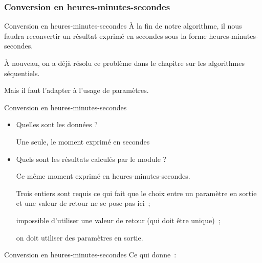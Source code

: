 \subsubsection{Conversion en heures-minutes-secondes}

\begin{frame}{Conversion en heures-minutes-secondes}
	À la fin de notre algorithme, il nous faudra reconvertir un résultat
	exprimé en secondes sous la forme heures-minutes-secondes. 
	
	\bigskip
	
	À nouveau,
	on a déjà résolu ce problème dans le chapitre sur les algorithmes
	séquentiels. 
	
	\bigskip
	
	Mais il faut l'adapter à
	l'usage de paramètres.
\end{frame}

\begin{frame}{Conversion en heures-minutes-secondes}
	\begin{itemize}
	\item {
		Quelles sont les données ? 
		
		Une seule, le moment exprimé en secondes}
		
	\bigskip
	
	\item {
		Quels sont les résultats calculés par le module ? 
		
		Ce même moment exprimé
		en heures-minutes-secondes. 
		
		Trois entiers sont requis ce qui fait que
		le choix entre un paramètre en sortie et une valeur de retour ne se
		pose pas ici~; 
		
		impossible d'utiliser une valeur de
		retour (qui doit être unique)~; 
		
		on doit utiliser des paramètres en
		sortie.}
	\end{itemize}
\end{frame}

\begin{frame}{Conversion en heures-minutes-secondes}
	Ce qui donne~:

	\bigskip
	
\end{frame}

